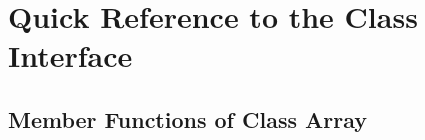 %
%

	\section{Quick Reference to the Class Interface}
	\label{classReference:sec:array}

	\subsection{Member Functions of Class Array}

